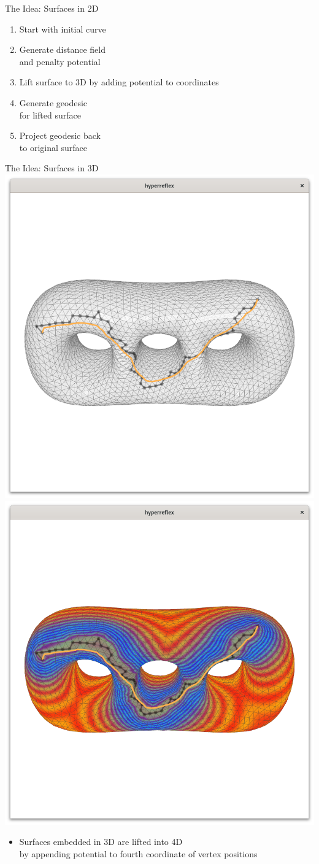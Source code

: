 \documentclass[aspectratio=169,fleqn]{beamer}
\begin{document}
\begin{frame}{The Idea: Surfaces in 2D}
\begin{minipage}[c]{0.45\linewidth}
    \end{minipage}
    \hfill
    \begin{minipage}[c]{0.45\linewidth}
      \pause
      \begin{enumerate}
        \item<+-> Start with initial curve
        \item<+-> Generate distance field \\ and penalty potential
        \item<+-> Lift surface to 3D by adding potential to coordinates
        \item<+-> Generate geodesic \\ for lifted surface
        \item<+-> Project geodesic back \\ to original surface
      \end{enumerate}
    \end{minipage}
  \end{frame}

  \begin{frame}{The Idea: Surfaces in 3D}
    \includegraphics[width=0.45\linewidth,trim={20px 200 20 200},clip]{images/holes-light.png}
    \hfill
    \includegraphics[width=0.45\linewidth,trim={20px 200 20 200},clip]{images/holes-heat.png}

    \bigskip
    \pause
    \begin{itemize}
      \item Surfaces embedded in 3D are lifted into 4D \\ by appending potential to fourth coordinate of vertex positions
    \end{itemize}
  \end{frame}
\end{document}
